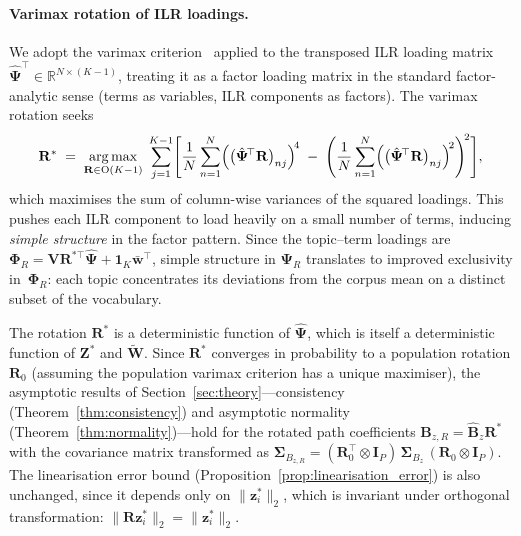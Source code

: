 \paragraph{Varimax rotation of ILR loadings.}
We adopt the varimax criterion~\citep{kaiser1958varimax} applied to
the transposed ILR loading matrix
$\hat{\boldsymbol{\Psi}}^{\!\top}\in\mathbb{R}^{N\times(K-1)}$,
treating it as a factor loading matrix in the standard factor-analytic
sense (terms as variables, ILR components as factors). The varimax
rotation seeks
\begin{equation}
  \mathbf{R}^*
  \;=\;
  \operatorname*{arg\,max}_{\mathbf{R}\in\mathrm{O}(K-1)}\;
  \sum_{j=1}^{K-1}
  \Biggl[
    \frac{1}{N}\sum_{n=1}^{N}
    \Bigl(\bigl(\hat{\boldsymbol{\Psi}}^{\!\top}\mathbf{R}\bigr)_{nj}
    \Bigr)^{\!4}
    \;-\;
    \Biggl(
      \frac{1}{N}\sum_{n=1}^{N}
      \Bigl(\bigl(\hat{\boldsymbol{\Psi}}^{\!\top}\mathbf{R}\bigr)_{nj}
      \Bigr)^{\!2}
    \Biggr)^{\!2}
  \Biggr],
  \label{eq:varimax}
\end{equation}
which maximises the sum of column-wise variances of the squared
loadings. This pushes each ILR component to load heavily on a small
number of terms, inducing \emph{simple structure} in the factor
pattern. Since the topic--term loadings are
$\boldsymbol{\Phi}_R = \mathbf{V}\mathbf{R}^{*\top}
\hat{\boldsymbol{\Psi}} + \mathbf{1}_K\bar{\mathbf{w}}^{\!\top}$,
simple structure in $\boldsymbol{\Psi}_R$ translates to improved
exclusivity in~$\boldsymbol{\Phi}_R$: each topic concentrates its
deviations from the corpus mean on a distinct subset of the
vocabulary.
 
\begin{remark}
\label{rem:rotation_theory}
The rotation $\mathbf{R}^*$ is a deterministic function of
$\hat{\boldsymbol{\Psi}}$, which is itself a deterministic function
of $\mathbf{Z}^*$ and $\widetilde{\mathbf{W}}$. Since
$\mathbf{R}^*$ converges in probability to a population rotation
$\mathbf{R}_0$ (assuming the population varimax criterion has a unique
maximiser), the asymptotic results of
Section~\ref{sec:theory}---consistency
(Theorem~\ref{thm:consistency}) and asymptotic normality
(Theorem~\ref{thm:normality})---hold for the rotated path
coefficients $\mathbf{B}_{z,R} = \hat{\mathbf{B}}_z\mathbf{R}^*$
with the covariance matrix transformed as
$\boldsymbol{\Sigma}_{B_{z,R}}
 = (\mathbf{R}_0^{\!\top}\otimes\mathbf{I}_P)\,
   \boldsymbol{\Sigma}_{B_z}\,
   (\mathbf{R}_0\otimes\mathbf{I}_P)$.
The linearisation error bound
(Proposition~\ref{prop:linearisation_error}) is also
unchanged, since it depends only on $\|\mathbf{z}_i^*\|_2$, which is
invariant under orthogonal transformation:
$\|\mathbf{R}\mathbf{z}_i^*\|_2 = \|\mathbf{z}_i^*\|_2$.
\end{remark}
 
